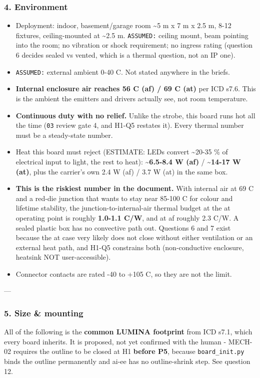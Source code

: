 \documentclass[11pt,a4paper]{article}
\begin{document}
\subsubsection*{4. Environment}
\begin{itemize}
\item Deployment: indoor, basement/garage room \textasciitilde{}5 m x 7 m x 2.5 m, 8-12 fixtures,
ceiling-mounted at \textasciitilde{}2.5 m. \texttt{ASSUMED:} ceiling mount, beam pointing into the
room; no vibration or shock requirement; no ingress rating (question 6
decides sealed vs vented, which is a thermal question, not an IP one).
\item \texttt{ASSUMED:} external ambient 0-40 C. Not stated anywhere in the briefs.
\item \textbf{Internal enclosure air reaches 56 C (af) / 69 C (at)} per ICD s7.6. This
is the ambient the emitters and drivers actually see, not room temperature.
\item \textbf{Continuous duty with no relief.} Unlike the strobe, this board runs hot
all the time (\texttt{03} review gate 4, and H1-Q5 restates it). Every thermal
number must be a steady-state number.
\item Heat this board must reject (ESTIMATE: LEDs convert \textasciitilde{}20-35 \% of electrical
input to light, the rest to heat): \textbf{\textasciitilde{}6.5-8.4 W (af)} / \textbf{\textasciitilde{}14-17 W (at)},
plus the carrier's own 2.4 W (af) / 3.7 W (at) in the same box.
\item \textbf{This is the riskiest number in the document.} With internal air at 69 C
and a red-die junction that wants to stay near 85-100 C for colour and
lifetime stability, the junction-to-internal-air thermal budget at the at
operating point is roughly \textbf{1.0-1.1 C/W}, and at af roughly 2.3 C/W. A
sealed plastic box has no convective path out. Questions 6 and 7 exist
because the at case very likely does not close without either ventilation or
an external heat path, and H1-Q5 constrains both (non-conductive enclosure,
heatsink NOT user-accessible).
\item Connector contacts are rated -40 to +105 C, so they are not the limit.
\end{itemize}
---

\subsubsection*{5. Size \& mounting}
All of the following is the \textbf{common LUMINA footprint} from ICD s7.1, which every board inherits. It is proposed, not yet confirmed with the human - MECH-02 requires the outline to be closed at H1 \textbf{before P5}, because \texttt{board\_init.py} binds the outline permanently and ai-ee has no outline-shrink step. See question 12.
\end{document}
